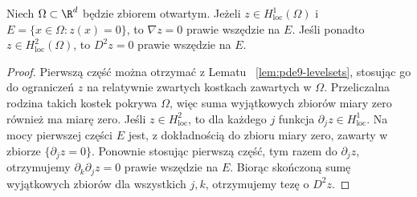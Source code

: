 \begin{lemat}
\label{lem:pde29-zero-level}
Niech $\Omega\subset\R^d$ będzie zbiorem otwartym.
Jeżeli $z\in H^1_{\mathrm{loc}}(\Omega)$ i
$E=\{x\in\Omega:z(x)=0\}$, to $\nabla z=0$
prawie wszędzie na $E$. Jeśli ponadto $z\in H^2_{\mathrm{loc}}(\Omega)$,
to $D^2z=0$ prawie wszędzie na $E$.
\end{lemat}
\begin{proof}
Pierwszą część można otrzymać z Lematu
~\ref{lem:pde9-levelsets}, stosując go do ograniczeń
$z$ na relatywnie zwartych kostkach zawartych w $\Omega$.
Przeliczalna rodzina takich kostek pokrywa $\Omega$,
więc suma wyjątkowych zbiorów miary zero również
ma miarę zero.
Jeśli $z\in H^2_{\mathrm{loc}}$, to dla każdego $j$
funkcja $\partial_jz\in H^1_{\mathrm{loc}}$.
Na mocy pierwszej części $E$ jest, z dokładnością
do zbioru miary zero, zawarty w zbiorze
$\{\partial_jz=0\}$. Ponownie stosując pierwszą część,
tym razem do $\partial_jz$, otrzymujemy
$\partial_k\partial_jz=0$ prawie wszędzie na $E$.
Biorąc skończoną sumę wyjątkowych zbiorów
dla wszystkich $j,k$, otrzymujemy tezę o $D^2z$.
\end{proof}


